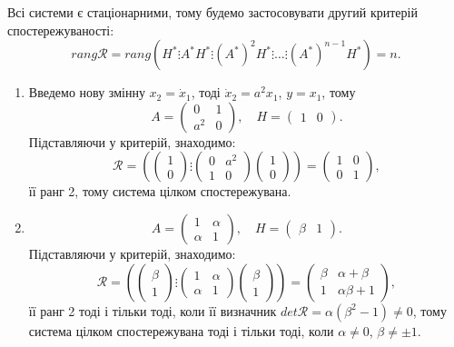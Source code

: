 \begin{solution}
    Всі системи є стаціонарними, тому будемо застосовувати другий критерій спостережуваності: \[ rang \mathcal{R} = rang \left(H^* \vdots A^* H^* \vdots (A^*)^2 H^* \vdots \ldots \vdots (A^*)^{n-1} H^*\right) = n. \]

    \begin{enumerate}
    	\item Введемо нову змінну $x_2 = \dot x_1$, тоді $\dot x_2 = a^2 x_1$, $y = x_1$, тому \[ A = \begin{pmatrix} 0 & 1 \\ a^2 & 0 \end{pmatrix}, \quad H = \begin{pmatrix} 1 & 0 \end{pmatrix}. \] Підставляючи у критерій, знаходимо: \[ \mathcal{R} = \left(\begin{pmatrix} 1 \\ 0 \end{pmatrix} \vdots \begin{pmatrix} 0 & a^2 \\ 1 & 0 \end{pmatrix} \begin{pmatrix} 1 \\ 0 \end{pmatrix}\right) = \begin{pmatrix} 1 & 0 \\ 0 & 1 \end{pmatrix}, \] її ранг 2, тому система цілком спостережувана.

    	\item \[ A = \begin{pmatrix} 1 & \alpha \\ \alpha & 1 \end{pmatrix}, \quad H = \begin{pmatrix} \beta & 1 \end{pmatrix}. \] Підставляючи у критерій, знаходимо: \[ \mathcal{R} = \left(\begin{pmatrix} \beta \\ 1 \end{pmatrix} \vdots \begin{pmatrix} 1 & \alpha \\ \alpha & 1 \end{pmatrix} \begin{pmatrix} \beta \\ 1 \end{pmatrix}\right) = \begin{pmatrix} \beta & \alpha + \beta \\ 1 & \alpha \beta + 1 \end{pmatrix}, \] її ранг 2 тоді і тільки тоді, коли її визначник $det \mathcal{R} = \alpha (\beta^2 - 1) \ne 0$, тому система цілком спостережувана тоді і тільки тоді, коли $\alpha \ne 0$, $\beta \ne \pm 1$.


\end{enumerate}
\end{solution}
